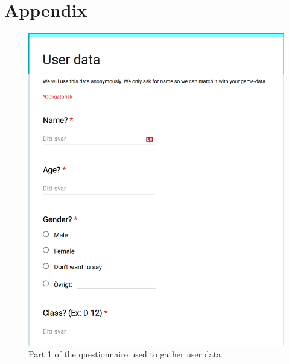 \documentclass[a4paper,12pt]{kth-mag}
\begin{document}
\chapter{Appendix}\label{appA}
\begin{figure}[ht]
	\centering
	\includegraphics[keepaspectratio, scale = 0.8]{images/user_data_1.png}
	\caption{\small{Part 1 of the questionnaire used to gather user data}}\label{fig:ud_1}
\end{figure}
\end{document}
